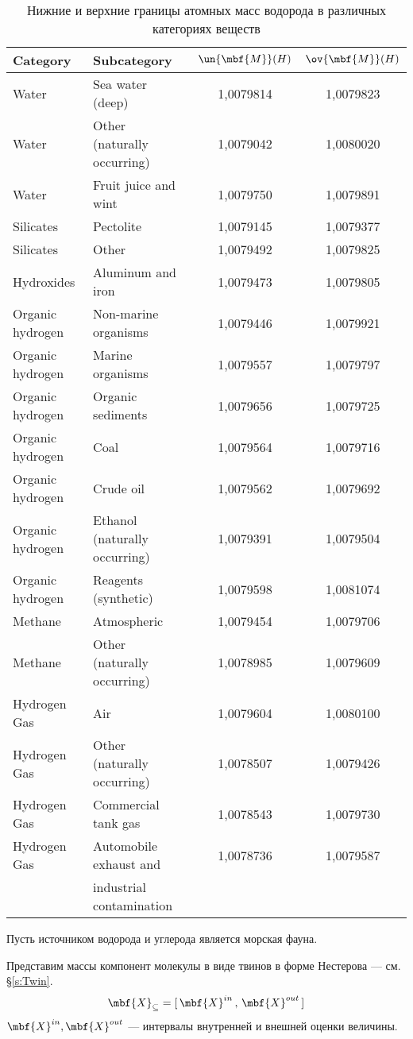 \documentclass[a5paper,openany]{book}
\begin{document}
\begin{table}[ht]
\caption{Нижние и верхние границы атомных масс водорода в различных категориях веществ}	
\label{IsotopeDataHydrogen}
{\small
\begin{tabular}{llcc}
Category & Subcategory & $\un{\mbf{M}}(H)$ & $\ov{\mbf{M}}(H)$ \\
\hline
Water&Sea water (deep)&1,0079814&1,0079823 \\
Water&Other (naturally occurring)&1,0079042&1,0080020\\
Water&Fruit juice and wint&1,0079750&1,0079891\\
Silicates&Pectolite&1,0079145&1,0079377\\
Silicates&Other&1,0079492&1,0079825\\
Hydroxides&Aluminum and iron&1,0079473&1,0079805\\
Organic hydrogen&Non-marine organisms&1,0079446&1,0079921\\
Organic hydrogen&Marine organisms&1,0079557&1,0079797\\
Organic hydrogen&Organic sediments&1,0079656&1,0079725\\
Organic hydrogen&Coal&1,0079564&1,0079716\\
Organic hydrogen&Crude oil&1,0079562&1,0079692\\
Organic hydrogen&Ethanol (naturally occurring)&1,0079391&1,0079504\\
Organic hydrogen&Reagents (synthetic)&1,0079598&1,0081074\\
Methane&Atmospheric&1,0079454&1,0079706\\
Methane&Other (naturally occurring)&1,0078985&1,0079609\\
Hydrogen Gas&Air&1,0079604&1,0080100\\
Hydrogen Gas&Other (naturally occurring)&1,0078507&1,0079426\\
Hydrogen Gas&Commercial tank gas&1,0078543&1,0079730\\
Hydrogen Gas&Automobile exhaust and &1,0078736&1,0079587\\
~&industrial contamination&~&~\\
\hline
\end{tabular}
}
\end{table}

Пусть источником водорода и углерода является  морская фауна. 

Представим массы компонент молекулы в виде твинов в форме Нестерова --- см. \S\ref{s:Twin}.
\begin{equation*}
	\mbf{X}_{\subseteq} = [ \, \mbf{X}^{in} \, ,  \, \mbf{X}^{out} \, ]
\end{equation*}
$\mbf{X}^{in}, \mbf{X}^{out}$ --- интервалы внутренней и внешней оценки величины.
\end{document}
